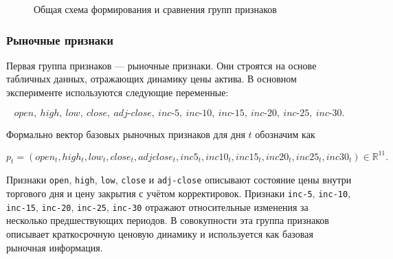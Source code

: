 \begin{figure}[htbp]
\centering
{}
\caption{Общая схема формирования и сравнения групп признаков}
\label{fig:feature_groups_scheme}
\end{figure}

\subsubsection{Рыночные признаки}

Первая группа признаков --- рыночные признаки. Они строятся на основе табличных данных, отражающих динамику цены актива. В основном эксперименте используются следующие переменные:

\[
open,\ high,\ low,\ close,\ adj\text{-}close,\ inc\text{-}5,\ inc\text{-}10,\ inc\text{-}15,\ inc\text{-}20,\ inc\text{-}25,\ inc\text{-}30.
\]

Формально вектор базовых рыночных признаков для дня $t$ обозначим как

\[
p_t = (open_t, high_t, low_t, close_t, adjclose_t, inc5_t, inc10_t, inc15_t, inc20_t, inc25_t, inc30_t) \in \mathbb{R}^{11}.
\]

Признаки \texttt{open}, \texttt{high}, \texttt{low}, \texttt{close} и \texttt{adj-close} описывают состояние цены внутри торгового дня и цену закрытия с учётом корректировок. Признаки \texttt{inc-5}, \texttt{inc-10}, \texttt{inc-15}, \texttt{inc-20}, \texttt{inc-25}, \texttt{inc-30} отражают относительные изменения за несколько предшествующих периодов. В совокупности эта группа признаков описывает краткосрочную ценовую динамику и используется как базовая рыночная информация.

